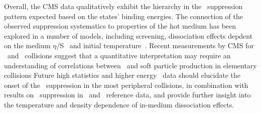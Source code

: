 Overall, the CMS data qualitatively exhibit the hierarchy in the \PgUn\ suppression pattern
expected based on the states' binding energies. The connection of the observed suppression 
systematics to properties of the hot medium has been explored in a number of models,
including screening, dissociation effects depdent on the medium $\eta/$S~\cite{Strickland:2012as} 
and initial temperature~\cite{Ganesh:2014lha}. Recent measurements by CMS for 
\pp\ and \pPb\ collisions suggest that a quantitative interpretation may require an understanding of correlations
between \PgUn\ and soft particle production in elementary collisions \cite{Chatrchyan:2013nza}
Future high statistics and higher energy \PbPb\ data should elucidate the onset of the \PgU\ suppression in the most 
peripheral collisions, in combination with results on \PgU\ suppression in \pp\ and \pPb\ 
reference data, and provide further insight into the temperature and density dependence
of in-medium dissociation effects.
